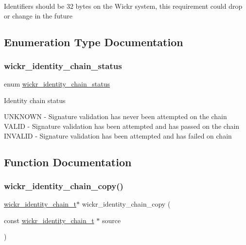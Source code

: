 Identifiers should be 32 bytes on the Wickr system, this requirement could drop or change in the future 

\subsection{Enumeration Type Documentation}
\mbox{\label{group__wickr__identity_ga78aefa3835eb13ca75c0129583b5ebfa}} 
\subsubsection{\texorpdfstring{wickr\+\_\+identity\+\_\+chain\+\_\+status}{wickr\_identity\_chain\_status}}
{\footnotesize\ttfamily enum \hyperlink{group__wickr__identity_ga78aefa3835eb13ca75c0129583b5ebfa}{wickr\+\_\+identity\+\_\+chain\+\_\+status}}

Identity chain status

U\+N\+K\+N\+O\+WN -\/ Signature validation has never been attempted on the chain V\+A\+L\+ID -\/ Signature validation has been attempted and has passed on the chain I\+N\+V\+A\+L\+ID -\/ Signature validation has been attempted and has failed on chain 

\subsection{Function Documentation}
\mbox{\label{group__wickr__identity_gac9d708d340abcd0b54d87434b71d2d9e}} 
\subsubsection{\texorpdfstring{wickr\+\_\+identity\+\_\+chain\+\_\+copy()}{wickr\_identity\_chain\_copy()}}
{\footnotesize\ttfamily \hyperlink{structwickr__identity__chain}{wickr\+\_\+identity\+\_\+chain\+\_\+t}$\ast$ wickr\+\_\+identity\+\_\+chain\+\_\+copy (\begin{DoxyParamCaption}\item[{const \hyperlink{structwickr__identity__chain}{wickr\+\_\+identity\+\_\+chain\+\_\+t} $\ast$}]{source }\end{DoxyParamCaption})}

